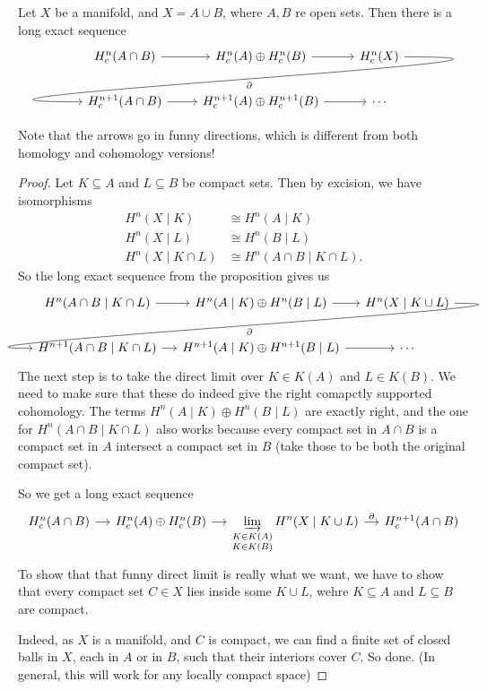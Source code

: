 \documentclass[a4paper]{article}
\begin{document}
\begin{cor}
  Let $X$ be a manifold, and $X = A \cup B$, where $A, B$ re open sets. Then there is a long exact sequence
  \[
    \begin{tikzcd}
      H^n_c(A \cap B) \ar[r] & H^n_c(A) \oplus H^n_c(B) \ar[r] & H_c^n(X)\ar[out=0, in=180, looseness=2, overlay, lld, "\partial"]\\
      H_c^{n+1}(A \cap B) \ar[r] & H_c^{n+1}(A) \oplus H_c^{n+1}(B) \ar[r] & \cdots
    \end{tikzcd}
  \]
\end{cor}
Note that the arrows go in funny directions, which is different from both homology and cohomology versions!

\begin{proof}
  Let $K \subseteq A$ and $L \subseteq B$ be compact sets. Then by excision, we have isomorphisms
  \begin{align*}
    H^n(X \mid K) &\cong H^n(A \mid K)\\
    H^n(X \mid L) &\cong H^n(B \mid L)\\
    H^n(X \mid K \cap L) &\cong H^n(A \cap B \mid K\cap L).
  \end{align*}
  So the long exact sequence from the proposition gives us
  \[
    \begin{tikzcd}[column sep=small]
      H^n(A \cap B\mid K \cap L) \ar[r] & H^n(A \mid K) \oplus H^n(B \mid L) \ar[r] & H^n(X \mid K \cup L) \ar[lld, out=0, in=180, overlay, "\partial"]\\
      H^{n + 1}(A \cap B \mid K \cap L) \ar[r] & H^{n + 1}(A \mid K) \oplus H^{n + 1}(B \mid L) \ar[r] & \cdots
    \end{tikzcd}
  \]
  The next step is to take the direct limit over $K \in K(A)$ and $L \in K(B)$. We need to make sure that these do indeed give the right comapctly supported cohomology. The terms $H^n(A \mid K) \oplus H^n (B \mid L)$ are exactly right, and the one for $H^n(A \cap B \mid K \cap L)$ also works because every compact set in $A \cap B$ is a compact set in $A$ intersect a compact set in $B$ (take those to be both the original compact set).

  So we get a long exact sequence
  \[
    \begin{tikzcd}[column sep=small]
      H^n_c(A \cap B) \ar[r] & H^n_c(A) \oplus H^n_c(B) \ar[r] & \displaystyle\varinjlim_{\substack{K \in K(A)\\ K \in K(B)}} H^n(X \mid K \cup L) \ar[r, "\partial"] & H^{n + 1}_c(A \cap B)
    \end{tikzcd}
  \]
  To show that that funny direct limit is really what we want, we have to show that every compact set $C \in X$ lies inside some $K \cup L$, wehre $K \subseteq A$ and $L \subseteq B$ are compact.

  Indeed, as $X$ is a manifold, and $C$ is compact, we can find a finite set of closed balls in $X$, each in $A$ or in $B$, such that their interiors cover $C$. So done. (In general, this will work for any locally compact space)
\end{proof}
\end{document}
